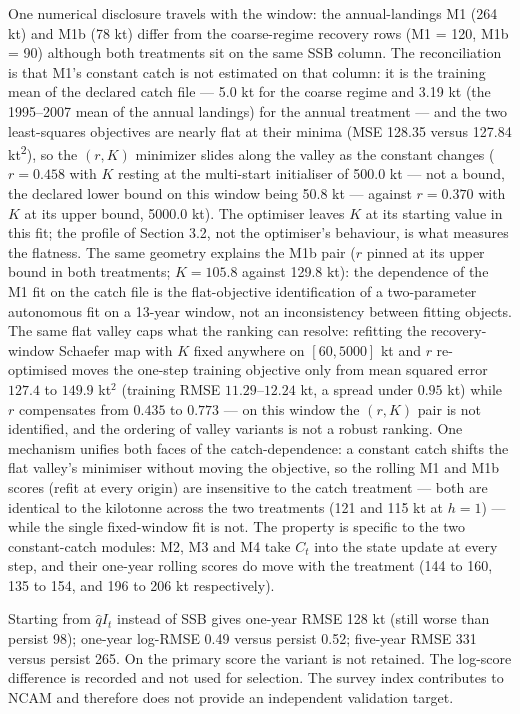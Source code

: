 \documentclass[11pt]{article}
\begin{document}
One numerical disclosure travels with the window: the annual-landings M1
(264 kt) and M1b (78 kt) differ from the coarse-regime recovery rows (M1
= 120, M1b = 90) although both treatments sit on the same SSB column.
The reconciliation is that M1's constant catch is not estimated on that
column: it is the training mean of the declared catch file --- 5.0 kt
for the coarse regime and 3.19 kt (the 1995--2007 mean of the annual
landings) for the annual treatment --- and the two least-squares
objectives are nearly flat at their minima (MSE 128.35 versus 127.84
kt\textsuperscript{2}), so the \((r, K)\) minimizer slides along the valley as the
constant changes (\(r = 0.458\) with \(K\) resting at the multi-start
initialiser of 500.0 kt --- not a bound, the declared lower bound on
this window being 50.8 kt --- against \(r = 0.370\) with \(K\) at its
upper bound, 5000.0 kt). The optimiser leaves \(K\) at its starting value in this fit; the
profile of Section 3.2, not the optimiser's behaviour, is what
measures the flatness. The
same geometry explains the M1b pair (\(r\) pinned at its
upper bound in both treatments; \(K = 105.8\) against 129.8 kt): the
dependence of the M1 fit on the catch file is the flat-objective
identification of a two-parameter autonomous fit on a 13-year window,
not an inconsistency between fitting objects. The same flat valley caps
what the ranking can resolve: refitting the recovery-window Schaefer map
with \(K\) fixed anywhere on \([60, 5000]\) kt and \(r\) re-optimised
moves the one-step training objective only from mean squared error
\(127.4\) to \(149.9\) kt\(^2\) (training RMSE \(11.29\)--\(12.24\) kt,
a spread under \(0.95\) kt) while \(r\) compensates from \(0.435\) to
\(0.773\) --- on this window the \((r, K)\) pair is not identified, and
the ordering of valley variants is not a robust ranking. One mechanism
unifies both faces of the catch-dependence: a constant catch shifts the
flat valley's minimiser without moving the objective, so the rolling
M1 and M1b scores (refit at every origin) are insensitive to the catch
treatment --- both are identical to the kilotonne across the two
treatments (121 and 115 kt at \(h=1\)) --- while the single
fixed-window fit is not. The property is specific to the two
constant-catch modules: M2, M3 and M4 take \(C_t\) into the state
update at every step, and their one-year rolling scores do move with the
treatment (144 to 160, 135 to 154, and 196 to 206 kt respectively).

Starting from \(\hat q I_t\) instead of SSB gives one-year RMSE 128 kt
(still worse than persist 98); one-year log-RMSE 0.49 versus persist
0.52; five-year RMSE 331 versus persist 265. On the primary score the
variant is not retained. The log-score difference is recorded and not
used for selection. The survey index contributes to NCAM and therefore
does not provide an independent validation target.
\end{document}

